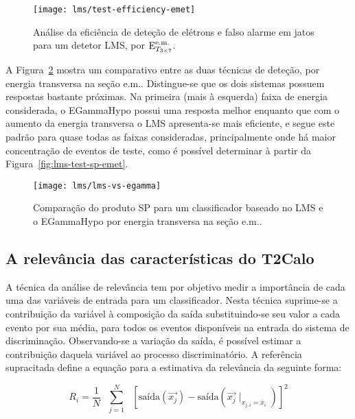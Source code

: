 \begin{figure}
\begin{center}
\texttt{[image: lms/test-efficiency-emet]}
\end{center}
\caption{Análise da eficiência de deteção de elétrons e falso alarme em jatos
para um detetor LMS, por $\text{E}^{\text{e.m.}}_{T_{3\times7}}$.}
\label{fig:lms-test-efficiency-emet}
\end{figure}

A Figura~\ref{fig:lms-vs-egamma} mostra um comparativo entre as duas técnicas
de deteção, por energia transversa na seção e.m.. Distingue-se que os dois
sistemas possuem respostas bastante próximas. Na primeira (mais à esquerda)
faixa de energia considerada, o EGammaHypo possui uma resposta melhor enquanto
que com o aumento da energia transversa o LMS apresenta-se mais eficiente, e
segue este padrão para quase todas as faixas consideradas, principalmente onde
há maior concentração de eventos de teste, como é possível determinar à partir
da Figura~\ref{fig:lms-test-sp-emet}.

\begin{figure}
\begin{center}
\texttt{[image: lms/lms-vs-egamma]}
\end{center}
\caption{Comparação do produto SP para um classificador baseado no LMS e o
EGammaHypo por energia transversa na seção e.m..}
\label{fig:lms-vs-egamma}
\end{figure}

\subsection{A relevância das características do T2Calo}

A técnica da análise de relevância \cite{relevance} tem por objetivo medir a
importância de cada uma das variáveis de entrada para um classificador. Nesta
técnica suprime-se a contribuição da variável à composição da saída
substituindo-se seu valor a cada evento por sua média, para todos os eventos
disponíveis na entrada do sistema de discriminação. Observando-se a variação
da saída, é possível estimar a contribuição daquela variável ao processo
discriminatório. A referência supracitada define a equação para a estimativa da
relevância da seguinte forma:

\begin{equation}
R_i = \frac{1}{N} \text{ } \overset{N}{\underset{j=1}{\sum}} \text{ }
[\text{saída}(\overrightarrow{x_j}) -
\text{saída}(\overrightarrow{x_j}\mid_{x_{j,i} = \overline{x}_i})]^2 
\label{eq:relevance-mse}
\end{equation}

